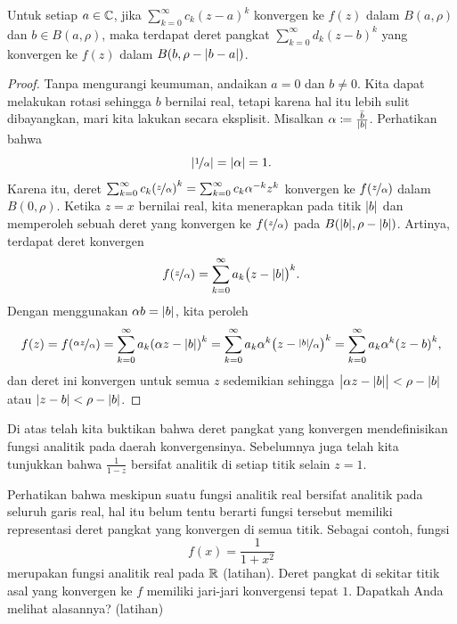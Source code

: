\begin{cor} \label{cor:powerseranalytic}
Untuk setiap $a \in {\mathbb{C}}$,
jika $\sum_{k=0}^\infty c_k {(z-a)}^k$ konvergen ke $f(z)$ dalam $B(a,\rho)$ dan $b \in
B(a,\rho)$,
maka terdapat deret pangkat
$\sum_{k=0}^\infty d_k {(z-b)}^k$ yang konvergen ke $f(z)$ dalam $B(b,\rho-\lvert {b-a} \rvert)$.
\end{cor}

\begin{proof}
Tanpa mengurangi keumuman, andaikan $a=0$ dan $b \neq 0$.  Kita dapat melakukan rotasi sehingga $b$ bernilai real, tetapi
karena hal itu lebih sulit dibayangkan, mari kita lakukan secara eksplisit.
Misalkan $\alpha \coloneqq \frac{\bar{b}}{\lvert {b} \rvert}$.
Perhatikan bahwa
\begin{equation*}
\left\lvert {\nicefrac{1}{\alpha}} \right\rvert = \lvert {\alpha} \rvert
= 1 .
\end{equation*}
Karena itu, deret
$\sum_{k=0}^\infty c_k {(\nicefrac{z}{\alpha})}^k = 
\sum_{k=0}^\infty c_k \alpha^{-k} {z}^k$
konvergen ke $f(\nicefrac{z}{\alpha})$ dalam $B(0,\rho)$.
Ketika $z=x$ bernilai real,
kita menerapkan  pada titik $\lvert {b} \rvert$ dan memperoleh
sebuah deret yang konvergen
ke $f(\nicefrac{z}{\alpha})$ pada $B(\lvert {b} \rvert,\rho-\lvert {b} \rvert)$.
Artinya, terdapat deret konvergen
\begin{equation*}
f(\nicefrac{z}{\alpha}) =
\sum_{k=0}^\infty a_k {\bigl(z - \lvert {b} \rvert\bigr)}^k .
\end{equation*}
Dengan menggunakan $\alpha b = \lvert {b} \rvert$, kita peroleh
\begin{equation*}
f(z) = f(\nicefrac{\alpha z}{\alpha}) =
\sum_{k=0}^\infty a_k {(\alpha z - \lvert {b} \rvert)}^k 
=
\sum_{k=0}^\infty a_k\alpha^k {\bigl(z - \nicefrac{\lvert {b} \rvert}{\alpha}\bigr)}^k
=
\sum_{k=0}^\infty a_k\alpha^k {(z - b)}^k ,
\end{equation*}
dan deret ini konvergen untuk semua $z$ sedemikian sehingga
$\bigl\lvert \alpha z-\lvert {b} \rvert\bigr\rvert < \rho-\lvert {b} \rvert$
atau $\lvert {z - b} \rvert < \rho-\lvert {b} \rvert$.
\end{proof}

Di atas telah kita buktikan bahwa deret pangkat yang konvergen mendefinisikan
fungsi analitik pada daerah konvergensinya.  Sebelumnya juga telah kita tunjukkan bahwa
$\frac{1}{1-z}$ bersifat analitik di setiap titik selain $z=1$.

Perhatikan bahwa meskipun suatu fungsi analitik real bersifat analitik pada
seluruh garis real, hal itu belum tentu berarti fungsi tersebut memiliki representasi deret pangkat
yang konvergen di semua titik.  Sebagai contoh, fungsi
\begin{equation*}
f(x) = \frac{1}{1+x^2}
\end{equation*}
merupakan fungsi analitik real pada ${\mathbb{R}}$ (latihan).  Deret
pangkat di sekitar titik asal yang konvergen ke $f$
memiliki jari-jari konvergensi tepat $1$.
Dapatkah Anda melihat alasannya? (latihan)

